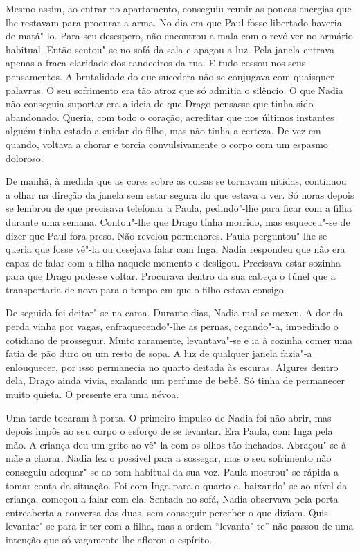 Mesmo assim, ao entrar no apartamento, conseguiu
reunir as poucas energias que lhe restavam para procurar a arma. No dia
em que Paul fosse libertado haveria de matá"-lo. Para seu desespero, não
encontrou a mala com o
revólver no armário habitual. Então sentou"-se no sofá da sala e apagou a
luz. Pela janela entrava apenas a fraca claridade dos candeeiros da rua.
E tudo cessou nos seus pensamentos. A brutalidade do que sucedera não se
conjugava com quaisquer palavras. O seu sofrimento era tão atroz que
só admitia o silêncio. O que Nadia não conseguia suportar era a ideia
de que Drago pensasse que tinha sido abandonado. Queria, com todo o
coração, acreditar que nos últimos instantes alguém tinha estado a
cuidar do filho, mas não tinha a certeza. De vez em quando, voltava a
chorar e torcia convulsivamente o corpo com um espasmo doloroso.

De manhã, à medida que as cores sobre as coisas se tornavam nítidas,
continuou a olhar na direção da janela sem estar segura do que estava a
ver. Só horas depois se lembrou de que precisava telefonar a Paula,
pedindo"-lhe para ficar com a filha durante uma semana. Contou"-lhe que
Drago tinha morrido, mas esqueceu"-se de dizer que Paul fora preso. Não
revelou pormenores. Paula perguntou"-lhe se queria que fosse vê"-la ou desejava falar com Inga. Nadia
respondeu que não era capaz de falar com a filha naquele momento e
desligou. Precisava estar sozinha para que Drago pudesse voltar.
Procurava dentro da sua cabeça o túnel que a transportaria de novo para
o tempo em que o filho estava consigo.

De seguida foi deitar"-se na cama. Durante dias, Nadia mal se mexeu. A
dor da perda vinha por vagas, enfraquecendo"-lhe as pernas, cegando"-a,
impedindo o cotidiano de prosseguir. Muito raramente, levantava"-se e
ia à cozinha comer uma fatia de pão duro ou um resto de sopa.
A luz de qualquer janela fazia"-a enlouquecer, por isso permanecia no
quarto deitada às escuras. Algures dentro dela, Drago ainda vivia,
exalando um perfume de bebê. Só tinha de permanecer muito quieta. O
presente era uma névoa.

Uma tarde tocaram à porta. O primeiro impulso de Nadia foi não abrir,
mas depois impôs ao seu corpo o esforço de se levantar. Era Paula, com
Inga pela mão. A criança deu um grito ao vê"-la com os olhos tão
inchados. Abraçou"-se à mãe a chorar. Nadia fez o possível para a
sossegar, mas o seu sofrimento não conseguiu adequar"-se ao tom habitual
da sua voz. Paula mostrou"-se rápida a tomar conta da situação. Foi com
Inga para o quarto e, baixando"-se ao nível da criança, começou a falar com ela. Sentada no sofá, Nadia
observava pela porta entreaberta a conversa das duas, sem conseguir
perceber o que diziam. Quis levantar"-se para ir ter com a filha, mas a
ordem ``levanta"-te'' não passou de uma intenção que só vagamente lhe
aflorou o espírito.

